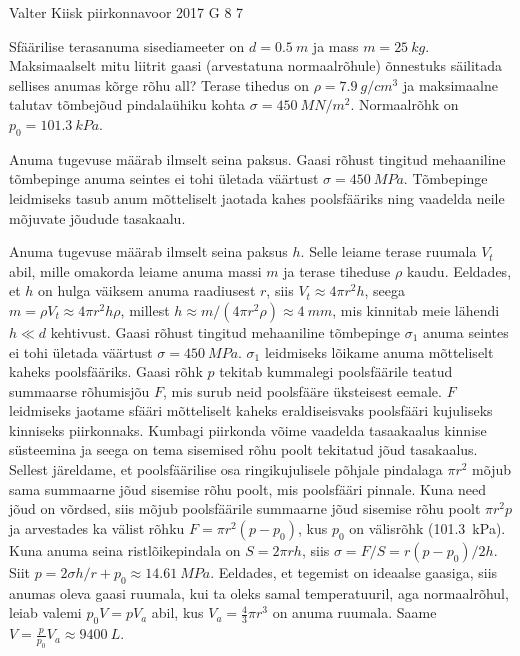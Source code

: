 {Valter Kiisk} %
{piirkonnavoor} %
{2017} %
{G 8} %
{7} %
{
\ifStatement
Sfäärilise terasanuma sisediameeter on $d=\SI{0.5}{m}$ ja mass $m=\SI{25}{kg}$. Maksimaalselt mitu liitrit gaasi (arvestatuna normaalrõhule) õnnestuks säilitada sellises anumas kõrge rõhu all? Terase tihedus on $\rho=\SI{7.9}{g/cm^3}$ ja maksimaalne talutav tõmbejõud pindalaühiku kohta $\sigma=\SI{450}{MN/m^2}$. Normaalrõhk on $p_0=\SI{101.3}{kPa}$.
\fi


\ifHint
Anuma tugevuse määrab ilmselt seina paksus. Gaasi rõhust tingitud mehaaniline tõmbepinge anuma seintes ei tohi ületada väärtust $\sigma=\SI{450}{MPa}$. Tõmbepinge leidmiseks tasub anum mõtteliselt jaotada kahes poolsfääriks ning vaadelda neile mõjuvate jõudude tasakaalu.
\fi


\ifSolution
Anuma tugevuse määrab ilmselt seina paksus $h$. Selle leiame terase ruumala $V_t$ abil, mille omakorda leiame anuma massi $m$ ja terase tiheduse $\rho$ kaudu. Eeldades, et $h$ on hulga väiksem anuma raadiusest $r$, siis $V_t\approx4\pi r^2 h$, seega $m=\rho V_t \approx 4\pi r^2h\rho$, millest $h\approx m/(4\pi r^2\rho)\approx \SI{4}{mm}$, mis kinnitab meie lähendi $h\ll d$ kehtivust. Gaasi rõhust tingitud mehaaniline tõmbepinge $\sigma_1$ anuma seintes ei tohi ületada väärtust $\sigma=\SI{450}{MPa}$. $\sigma_1$ leidmiseks lõikame anuma mõtteliselt kaheks poolsfääriks.
Gaasi rõhk $p$ tekitab kummalegi poolsfäärile teatud summaarse rõhumisjõu $F$, mis surub neid poolsfääre üksteisest eemale. $F$ leidmiseks jaotame sfääri mõtteliselt kaheks eraldiseisvaks poolsfääri kujuliseks kinniseks piirkonnaks. Kumbagi piirkonda võime vaadelda tasaakaalus kinnise süsteemina ja seega on tema sisemised rõhu poolt tekitatud jõud tasakaalus. Sellest järeldame, et poolsfäärilise osa ringikujulisele põhjale pindalaga $\pi r^2$ mõjub sama summaarne jõud sisemise rõhu poolt, mis poolsfääri pinnale. Kuna need jõud on võrdsed, siis mõjub poolsfäärile summaarne jõud sisemise rõhu poolt $\pi r^2 p$ ja arvestades ka välist rõhku $F=\pi r^2(p-p_0)$, kus $p_0$ on välisrõhk (\SI{101.3}{kPa}). Kuna anuma seina ristlõikepindala on $S=2\pi rh$, siis $\sigma=F/S=r(p-p_0)/2h$. Siit $p=2\sigma h/r+p_0\approx \SI{14.61}{MPa}$. Eeldades, et tegemist on ideaalse gaasiga, siis anumas oleva gaasi ruumala, kui ta oleks samal temperatuuril, aga normaalrõhul, leiab valemi $p_0V=pV_a$ abil, kus $V_a=\frac{4}{3}\pi r^3$ on anuma ruumala. Saame $V=\frac{p}{p_0}V_a\approx\SI{9400}{L}$.
\fi


}
